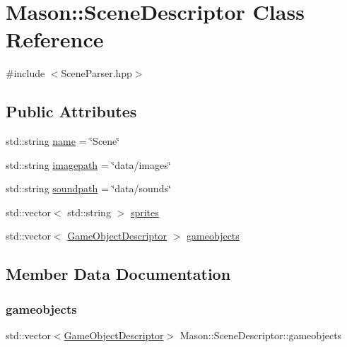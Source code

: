 \hypertarget{class_mason_1_1_scene_descriptor}{}\section{Mason\+:\+:Scene\+Descriptor Class Reference}
\label{class_mason_1_1_scene_descriptor}


{\ttfamily \#include $<$Scene\+Parser.\+hpp$>$}

\subsection*{Public Attributes}
\begin{DoxyCompactItemize}
\item 
std\+::string \hyperlink{class_mason_1_1_scene_descriptor_a847493eddb3e379f1b8e9308f2de8eb0}{name} = \char`\"{}Scene\char`\"{}
\item 
std\+::string \hyperlink{class_mason_1_1_scene_descriptor_a32d312e0bb11e5e3f5419f5d3a6d002a}{imagepath} = \char`\"{}data/images\char`\"{}
\item 
std\+::string \hyperlink{class_mason_1_1_scene_descriptor_acd7e349dc63b0692c2f4912765db2cbe}{soundpath} = \char`\"{}data/sounds\char`\"{}
\item 
std\+::vector$<$ std\+::string $>$ \hyperlink{class_mason_1_1_scene_descriptor_a0037cbfd772bbacb81017de405276475}{sprites}
\item 
std\+::vector$<$ \hyperlink{class_mason_1_1_game_object_descriptor}{Game\+Object\+Descriptor} $>$ \hyperlink{class_mason_1_1_scene_descriptor_a1883e270cf9361e9797269cc0bed1bbc}{gameobjects}
\end{DoxyCompactItemize}


\subsection{Member Data Documentation}
\hypertarget{class_mason_1_1_scene_descriptor_a1883e270cf9361e9797269cc0bed1bbc}{}\label{class_mason_1_1_scene_descriptor_a1883e270cf9361e9797269cc0bed1bbc} 
\subsubsection{\texorpdfstring{gameobjects}{gameobjects}}
{\footnotesize\ttfamily std\+::vector$<$\hyperlink{class_mason_1_1_game_object_descriptor}{Game\+Object\+Descriptor}$>$ Mason\+::\+Scene\+Descriptor\+::gameobjects}


